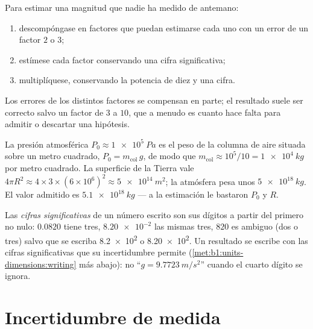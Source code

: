\begin{method}[Estimar]\label{met:b1:units-dimensions:estimate}
Para estimar una magnitud que nadie ha medido de antemano:
\begin{enumerate}
  \item descompóngase en factores que puedan estimarse cada uno con un
        error de un factor $2$ o $3$;
  \item estímese cada factor conservando una cifra significativa;
  \item multiplíquese, conservando la potencia de diez y una cifra.
\end{enumerate}
Los errores de los distintos factores se compensan en parte; el resultado
suele ser correcto salvo un factor de $3$ a $10$, que a menudo es cuanto
hace falta para admitir o descartar una hipótesis.
\end{method}

\begin{example}\label{ex:b1:units-dimensions:atmosphere}
La presión atmosférica $P_0 \approx \qty{1e5}{Pa}$ es el peso de la
columna de aire situada sobre un metro cuadrado, $P_0 = m_{\text{col}}\,g$,
de modo que $m_{\text{col}} \approx 10^5/10 = \qty{1e4}{kg}$ por metro
cuadrado. La superficie de la Tierra vale $4\pi R^2 \approx 4 \times 3 \times (6\times10^6)^2
\approx \qty{5e14}{m^2}$; la atmósfera pesa unos
$\qty{5e18}{kg}$. El valor admitido es $\qty{5.1e18}{kg}$ --- a la
estimación le bastaron $P_0$ y $R$.
\end{example}

\begin{definition}\label{def:b1:units-dimensions:sigfig}
Las \emph{cifras significativas} de un número escrito son sus dígitos a
partir del primero no nulo: $0.0820$ tiene tres, $\num{8.20e-2}$ las
mismas tres, $820$ es ambiguo (dos o tres) salvo que se escriba \num{8.2e2}
o \num{8.20e2}. Un resultado se escribe con las cifras significativas que
su incertidumbre permite (\cref{met:b1:units-dimensions:writing} más
abajo): no ``$g = \qty{9.7723}{m/s^2}$'' cuando el cuarto dígito se ignora.
\end{definition}

\section{Incertidumbre de medida}

